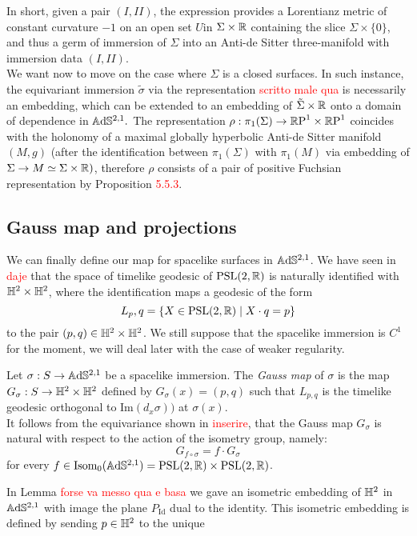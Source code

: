 In short, given a pair $(I,II)$, the expression  provides a Lorentianz metric of constant curvature $-1$ on an open set $U$in $\Sigma\times\mathbb{R}$ containing the slice $\Sigma\times\{0\}$, and thus a germ of immersion of $\Sigma$ into an Anti-de Sitter three-manifold with immersion data $(I,II)$.\\
We want now to move on the case where $\Sigma$ is a closed surfaces. In such instance, the equivariant immersion $\tilde{\sigma}$ via the representation \textcolor{red}{scritto male qua} is necessarily an embedding, which can be extended to an embedding of $\tilde{\Sigma}\times\mathbb{R}$ onto a domain of dependence in $\mathbb{A}\mathrm{d}\mathbb{S}^{2,1}.$
The representation $\rho:\pi_1(\Sigma)\to\mathbb{R}\text{P}^1\times\mathbb{R}\text{P}^1$ coincides with the holonomy of a maximal globally hyperbolic Anti-de Sitter manifold $(M,g)$ (after the identification between $\pi_1(\Sigma)$ with $\pi_1(M)$ via embedding of $\Sigma\to M\simeq\Sigma\times\mathbb{R})$, therefore $\rho$ consists of a pair of positive Fuchsian representation by Proposition \textcolor{red}{5.5.3}. \\ 

\subsection{Gauss map and projections} We can finally define our map for spacelike surfaces in $\mathbb{A}\mathrm{d}\mathbb{S}^{2,1}$. We have seen in \textcolor{red}{daje} that the space of timelike geodesic of $\text{PSL}(2,\mathbb{R})$ is naturally identified with $\mathbb{H}^2\times\mathbb{H}^2$, where the identification maps a geodesic of the form
\[
    L_p,q=\{X\in\text{PSL}(2,\mathbb{R})\;|\;X\cdot q =p\}
\]
to the pair $(p,q)\in \mathbb{H}^2\times\mathbb{H}^2$. We still suppose that the spacelike immersion is $C^1$ for the moment, we will deal later with the case of weaker regularity. 
\begin{definition}
    Let $\sigma:S\to\mathbb{A}\mathrm{d}\mathbb{S}^{2,1}$ be a spacelike immersion. The \textit{Gauss map} of $\sigma$ is the map $G_\sigma:S\to\mathbb{H}^2\times\mathbb{H}^2$ defined by $G_\sigma(x)=(p,q)$ such that $L_{p,q}$ is the timelike geodesic orthogonal to $\text{Im}(d_x\sigma))$ at $\sigma(x).$\\
    It follows from the equivariance shown in \textcolor{red}{inserire}, that the Gauss map $G_\sigma$ is natural with respect to the action of the isometry group, namely: 
    \[
        G_{f\circ\sigma}=f\cdot G_\sigma
    \]
    for every $f\in\text{Isom}_0(\mathbb{A}\mathrm{d}\mathbb{S}^{2,1})=\text{PSL}(2,\mathbb{R})\times\text{PSL}(2,\mathbb{R})$.
    \end{definition}

    \begin{example}
        In Lemma \textcolor{red}{forse va messo qua e basa} we gave an isometric embedding of $\mathbb{H}^2$ in $\mathbb{A}\mathrm{d}\mathbb{S}^{2,1}$ with image the plane $P_{\text{Id}}$ dual to the identity. This isometric embedding is defined by sending $p\in\mathbb{H}^2$ to the unique
    \end{example}

